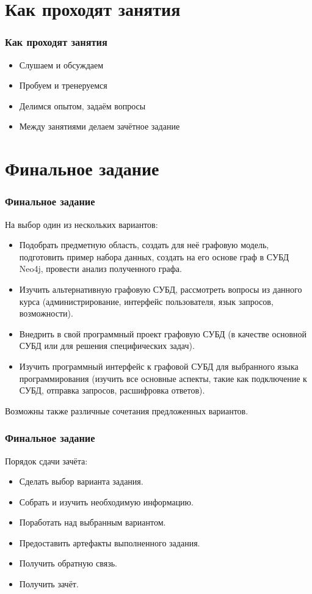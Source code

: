 \documentclass[11pt]{beamer}
\begin{document}
\section{Как проходят занятия}

\begin{frame}
  \frametitle{Как проходят занятия}
  \begin{itemize}
  \item Слушаем и обсуждаем
  \item Пробуем и тренеруемся
  \item Делимся опытом, задаём вопросы
  \item Между занятиями делаем зачётное задание
  \end{itemize}
\end{frame}

\section{Финальное задание}

\begin{frame}
  \frametitle{Финальное задание}
  На выбор один из нескольких вариантов:
  \begin{itemize}
  \item Подобрать предметную область, создать для неё графовую модель,
    подготовить пример набора данных, создать на его основе граф в СУБД Neo4j,
    провести анализ полученного графа.
  \item Изучить альтернативную графовую СУБД, рассмотреть вопросы из данного курса
    (администрирование, интерфейс пользователя, язык запросов, возможности).
  \item Внедрить в свой программный проект графовую СУБД (в качестве основной СУБД
    или для решения специфических задач).
  \item Изучить программный интерфейс к графовой СУБД для выбранного языка
    программирования (изучить все основные аспекты, такие как подключение к СУБД,
    отправка запросов, расшифровка ответов).
  \end{itemize}
  Возможны также различные сочетания предложенных вариантов.
\end{frame}

\begin{frame}
  \frametitle{Финальное задание}
  Порядок сдачи зачёта:
  \begin{itemize}
  \item Сделать выбор варианта задания.
  \item Собрать и изучить необходимую информацию.
  \item Поработать над выбранным вариантом.
  \item Предоставить артефакты выполненного задания.
  \item Получить обратную связь.
  \item Получить зачёт.
  \end{itemize}
\end{frame}
\end{document}
